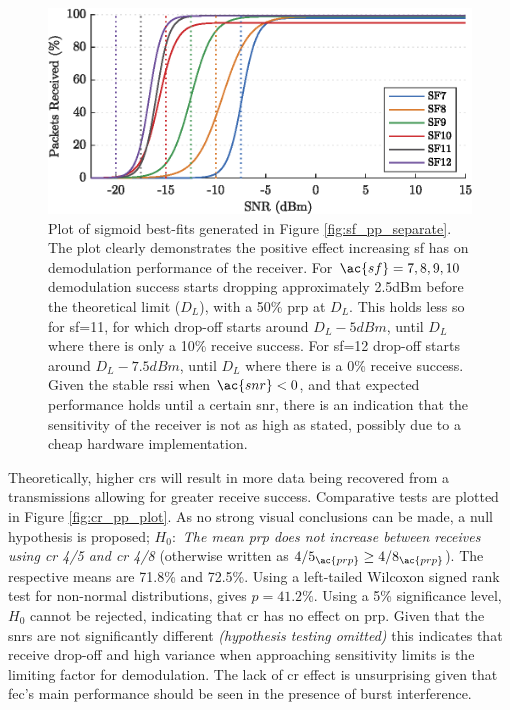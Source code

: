 \begin{figure}[H]
    \centering
   	\includegraphics{Figures/sf_fit_plot}
    \caption[Plot of sigmoid best-fits for \ac{snr} vs \ac{prp}]{
    Plot of sigmoid best-fits generated in Figure \ref{fig:sf_pp_separate}. The plot clearly demonstrates the positive effect increasing \ac{sf} has on demodulation performance of the receiver. For $\ac{sf}=7,8,9,10$ demodulation success starts dropping approximately 2.5dBm before the theoretical limit ($D_L$), with a 50\% \ac{prp} at $D_L$. This holds less so for \ac{sf}=11, for which drop-off starts around $D_L - 5dBm$, until $D_L$ where there is only a 10\% receive success. For \ac{sf}=12 drop-off starts around $D_L - 7.5dBm$, until $D_L$ where there is a 0\% receive success. Given the stable \ac{rssi} when $\ac{snr} < 0$, and that expected performance holds until a certain \ac{snr}, there is an indication that the sensitivity of the receiver is not as high as stated, possibly due to a cheap hardware implementation.
     }
    \label{fig:sf_pp_fit}
\end{figure}

Theoretically, higher \ac{cr}s will result in more data being recovered from a transmissions allowing for greater receive success. Comparative tests are plotted in Figure \ref{fig:cr_pp_plot}. As no strong visual conclusions can be made, a null hypothesis is proposed; $H_{0} : $ \textit{The mean \ac{prp} does not increase between receives using \ac{cr} 4/5 and \ac{cr} 4/8} (otherwise written as $4/5_{\ac{prp}} \geq 4/8_{\ac{prp}}$). The respective means are 71.8\% and 72.5\%. Using a left-tailed Wilcoxon signed rank test for non-normal distributions, gives $p=41.2\%$. Using a 5\% significance level,  $H_{0}$ cannot be rejected, indicating that \ac{cr} has no effect on \ac{prp}.  Given that the \ac{snr}s are not significantly different \textit{(hypothesis testing omitted)} this indicates that receive drop-off and high variance when approaching sensitivity limits is the limiting factor for demodulation. The lack of \ac{cr} effect is unsurprising given that \ac{fec}'s main performance should be seen in the presence of burst interference.

